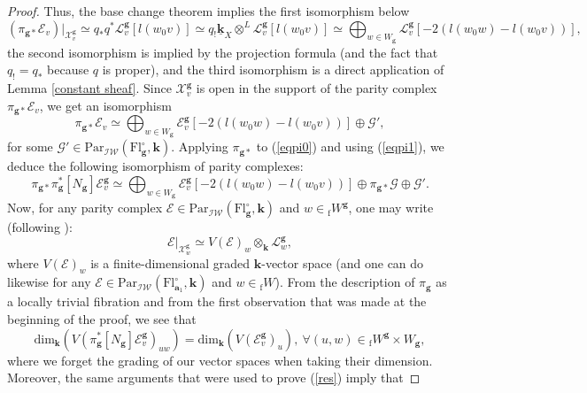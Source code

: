 \documentclass[11pt]{amsart}
\theoremstyle{plain}
\theoremstyle{remark}
\numberwithin{equation}{section}
\begin{document}
\begin{proof}
		
		Thus, the base change theorem implies  the first isomorphism below  \begin{equation}\label{res}
			(\pi_{\mathbf{g}*}\mathcal{E}_v)|_{\mathscr{X}^\mathbf{g}_{v}}\simeq q_*q^*\mathcal{L}^\mathbf{g}_v[l(w_0v)]\simeq q_!\underline{\mathbf{k}}_X\otimes^L\mathcal{L}^\mathbf{g}_v[l(w_0v)]\simeq \bigoplus_{w\in W_\mathbf{g}}\mathcal{L}^\mathbf{g}_v[-2(l(w_0w)-l(w_0v))],
		\end{equation}the second isomorphism is implied by the projection formula (and the fact that $q_!=q_*$ because $q$ is proper), and the third isomorphism is a direct application of Lemma \ref{constant sheaf}. Since $\mathscr{X}^\mathbf{g}_{v}$ is open in the support of the parity complex $\pi_{\mathbf{g}*}\mathcal{E}_v$, we get an isomorphism
		\begin{equation}\label{eqpi1}
		    \pi_{\mathbf{g}*}\mathcal{E}_v\simeq \bigoplus_{w\in W_\mathbf{g}}\mathcal{E}_v^\mathbf{g}[-2(l(w_0w)-l(w_0v))]\oplus \mathcal{G}', 
		\end{equation}
		for some $\mathcal{G}'\in \mathrm{Par}_{\mathcal{IW}}(\mathrm{Fl}^{\circ}_{\mathbf{g}},\mathbf{k})$. Applying $\pi_{\mathbf{g}*}$ to (\ref{eqpi0}) and using (\ref{eqpi1}), we deduce the following isomorphism of parity complexes:
		$$\pi_{\mathbf{g}*}\pi_{\mathbf{g}}^*[N_{\mathbf{g}}]\mathcal{E}^\mathbf{g}_v\simeq \bigoplus_{w\in W_\mathbf{g}}\mathcal{E}_v^\mathbf{g}[-2(l(w_0w)-l(w_0v))]\oplus \pi_{\mathbf{g}*}\mathcal{G}\oplus \mathcal{G}'.$$
		Now, for any parity complex $\mathcal{E}\in \mathrm{Par}_{\mathcal{IW}}(\mathrm{Fl}^{\circ}_{\mathbf{g}},\mathbf{k})$ and $w\in {_\mathrm{f}W}^\mathbf{g}$, one may write (following \cite{williamson2012modular}): $$\mathcal{E}|_{\mathscr{X}^\mathbf{g}_{w}}\simeq V(\mathcal{E})_w\otimes_\mathbf{k}\mathcal{L}_w^\mathbf{g},$$ where $V(\mathcal{E})_w$ is a finite-dimensional graded $\mathbf{k}$-vector space (and one can do likewise for any $\mathcal{E}\in \mathrm{Par}_{\mathcal{IW}}(\mathrm{Fl}^{\circ}_{\mathbf{a}_1},\mathbf{k})$ and $w\in {_\mathrm{f}W}$). From the description of $\pi_\mathbf{g}$ as a locally trivial fibration and from the first observation that was made at the beginning of the proof, we see that 
		$$\mathrm{dim}_\mathbf{k}(V(\pi_{\mathbf{g}}^*[N_{\mathbf{g}}]\mathcal{E}^\mathbf{g}_v)_{uw})=\mathrm{dim}_\mathbf{k}(V(\mathcal{E}^\mathbf{g}_v)_{u}),~\forall (u,w)\in {_\mathrm{f}W}^\mathbf{g}\times W_\mathbf{g}, $$
		where we forget the grading of our vector spaces when taking their dimension. Moreover, the same arguments that were used to prove (\ref{res}) imply that

\end{proof}
\end{document}
